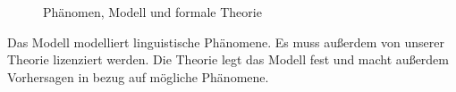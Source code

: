 \begin{figure}[htbp]
\caption{\label{abb-modell}Phänomen, Modell und formale Theorie}
\end{figure}\nocite{Netter98a}%
%
%
%
Das Modell modelliert linguistische Phänomene. Es muss außerdem
von unserer Theorie lizenziert werden.
Die Theorie legt das Modell fest %
und macht außerdem Vorhersagen in bezug auf mögliche
Phänomene.

